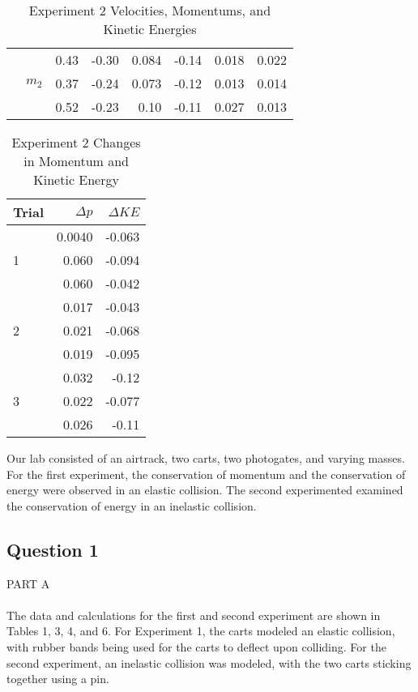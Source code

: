 \documentclass [12pt, letterpaper, twoside] {article}
\begin{document}
\begin {table}[h]
\begin {tabular} {| c | c | r | r | r | r | r | r |}
    \cline{2-8}
    & \multirow {3}{*}{\(m_{2}\)} & 0.43 & -0.30 & 0.084 & -0.14 & 0.018 & 0.022 \\ %
    & & 0.37 & -0.24 & 0.073 & -0.12 & 0.013 & 0.014 \\ %
    & & 0.52 & -0.23 & 0.10 & -0.11 & 0.027 & 0.013 \\ %
    \hline\hline
  \end {tabular}
  \caption {Experiment 2 Velocities, Momentums, and Kinetic Energies}
\end {table}

\begin {table}[h]
  \centering
  \begin {tabular} {| l | r | r |}
    \hline\hline
    Trial & \(\Delta{p}\) & \(\Delta{KE}\) \\
    \hline
    \multirow {3}{*}{1} & 0.0040 & -0.063 \\ %
    & 0.060 & -0.094 \\ %
    & 0.060 & -0.042 \\ %
    \hline
    \multirow {3}{*}{2} & 0.017 & -0.043 \\ %
    & 0.021 & -0.068 \\ %
    & 0.019 & -0.095 \\ %
    \hline
    \multirow {3}{*}{3} & 0.032 & -0.12 \\ %
    & 0.022 & -0.077 \\ %
    & 0.026 & -0.11 \\ %
    \hline\hline
  \end {tabular}
  \caption {Experiment 2 Changes in Momentum and Kinetic Energy}
\end {table}

\noindent
Our lab consisted of an airtrack, two carts, two photogates, and varying masses. For the first experiment, the conservation of momentum and the conservation of energy were observed in an elastic collision. The second experimented examined the conservation of energy in an inelastic collision.

\subsection* {Question 1}

PART A \\\\
The data and calculations for the first and second experiment are shown in Tables 1, 3, 4, and 6. For Experiment 1, the carts modeled an elastic collision, with rubber bands being used for the carts to deflect upon colliding. For the second experiment, an inelastic collision was modeled, with the two carts sticking together using a pin. \\
\end{document}
